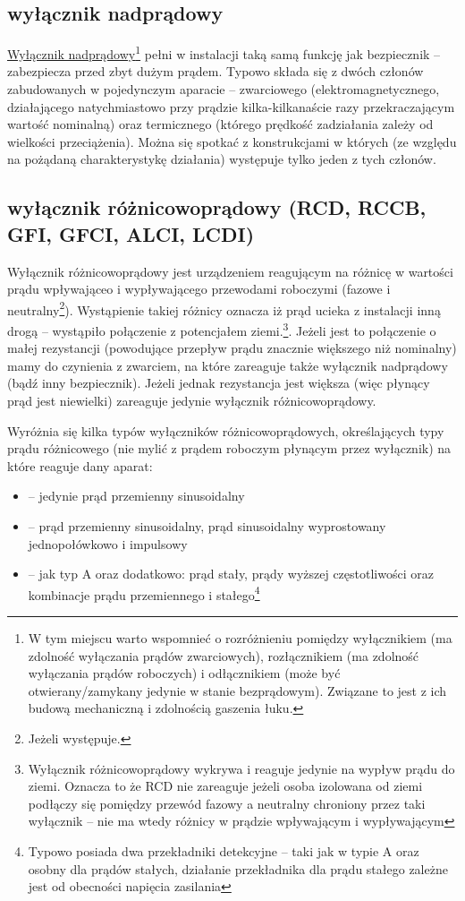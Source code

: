 \subsection{wyłącznik nadprądowy}

\href{https://pl.wikipedia.org/wiki/Wyłącznik_instalacyjny}{Wyłącznik nadprądowy}\footnote{
	W tym miejscu warto wspomnieć o rozróżnieniu pomiędzy wyłącznikiem (ma zdolność wyłączania prądów zwarciowych), rozłącznikiem (ma zdolność wyłączania prądów roboczych) i odłącznikiem (może być otwierany/zamykany jedynie w stanie bezprądowym). Związane to jest z ich budową mechaniczną i zdolnością gaszenia łuku.
} pełni w instalacji taką samą funkcję jak bezpiecznik – zabezpiecza przed zbyt dużym prądem.
Typowo składa się z dwóch członów zabudowanych w pojedynczym aparacie – zwarciowego (elektromagnetycznego, działającego natychmiastowo przy prądzie kilka-kilkanaście razy przekraczającym wartość nominalną) oraz termicznego (którego prędkość zadziałania zależy od wielkości przeciążenia). Można się spotkać z konstrukcjami w których (ze względu na pożądaną charakterystykę działania) występuje tylko jeden z tych członów.

\subsection{wyłącznik różnicowoprądowy (RCD, RCCB, GFI, GFCI, ALCI, LCDI)}

Wyłącznik różnicowoprądowy jest urządzeniem reagującym na różnicę w wartości prądu wpływająceo i wypływającego przewodami roboczymi (fazowe i neutralny\footnote{Jeżeli występuje.}).
Wystąpienie takiej różnicy oznacza iż prąd ucieka z instalacji inną drogą – wystąpiło połączenie z potencjałem ziemi.\footnote{
	Wyłącznik różnicowoprądowy wykrywa i reaguje jedynie na wypływ prądu do ziemi.
	Oznacza to że RCD nie zareaguje jeżeli osoba izolowana od ziemi podłączy się pomiędzy przewód fazowy a neutralny chroniony przez taki wyłącznik – nie ma wtedy różnicy w prądzie wpływającym i wypływającym
}.
Jeżeli jest to połączenie o małej rezystancji (powodujące przepływ prądu znacznie większego niż nominalny) mamy do czynienia z zwarciem, na które zareaguje także wyłącznik nadprądowy (bądź inny bezpiecznik).
Jeżeli jednak rezystancja jest większa (więc płynący prąd jest niewielki) zareaguje jedynie wyłącznik różnicowoprądowy.

Wyróżnia się kilka typów wyłączników różnicowoprądowych, określających typy prądu różnicowego (nie mylić z prądem roboczym płynącym przez wyłącznik) na które reaguje dany aparat:
\begin{itemize}
	\item {} – jedynie prąd przemienny sinusoidalny 
	\item {}  – prąd przemienny sinusoidalny, prąd sinusoidalny wyprostowany jednopołówkowo i impulsowy
	\item {}  – jak typ A oraz dodatkowo: prąd stały, prądy wyższej częstotliwości oraz kombinacje prądu przemiennego i stałego\footnote{
		Typowo posiada dwa przekładniki detekcyjne – taki jak w typie A oraz osobny dla prądów stałych, działanie przekładnika dla prądu stałego zależne jest od obecności napięcia zasilania}
\end{itemize}

